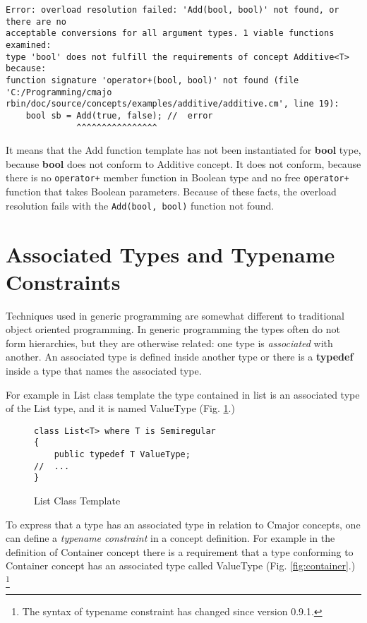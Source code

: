 \documentclass[oneside, a4paper, 11pt]{article}
\begin{document}
\begin{verbatim}
Error: overload resolution failed: 'Add(bool, bool)' not found, or there are no
acceptable conversions for all argument types. 1 viable functions examined:
type 'bool' does not fulfill the requirements of concept Additive<T> because:
function signature 'operator+(bool, bool)' not found (file 'C:/Programming/cmajo
rbin/doc/source/concepts/examples/additive/additive.cm', line 19):
    bool sb = Add(true, false); //  error
              ^^^^^^^^^^^^^^^^
\end{verbatim}

It means that the Add function template has not been instantiated for \textbf{bool} type,
because \textbf{bool} does not conform to Additive concept. It does not conform,
because there is no \verb|operator+| member function in Boolean type and no
free \verb|operator+| function that takes Boolean parameters.
Because of these facts, the overload resolution fails with the \verb|Add(bool, bool)| function
not found.

\section{Associated Types and Typename Constraints}

Techniques used in generic programming are somewhat different to traditional object oriented programming.
In generic programming the types often do not form hierarchies, but they are otherwise related:
one type is \emph{associated} with another. An associated type is defined inside another type or
there is a \textbf{typedef} inside a type that names the associated type.

For example in List class template the type contained in list is an associated type of the List type,
and it is named ValueType (Fig. \ref{fig:list}.)

\begin{figure}[htb]\caption{List Class Template}\label{fig:list}
\begin{lstlisting}[frame=trBL]
class List<T> where T is Semiregular
{
    public typedef T ValueType;
//  ...
}
\end{lstlisting}
\end{figure}

To express that a type has an associated type in relation to Cmajor concepts, one
can define a \emph{typename constraint} in a concept definition.
For example in the definition of Container concept there is a requirement that
a type conforming to Container concept has an associated type called ValueType
(Fig. \ref{fig:container}.) \footnote{The syntax of typename constraint has
changed since version 0.9.1.}
\end{document}
